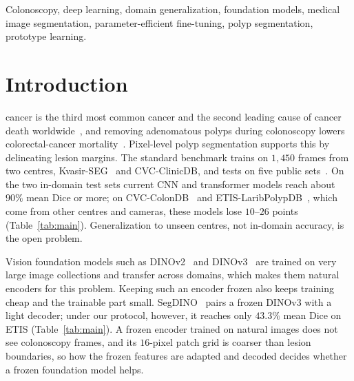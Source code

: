 \documentclass{ieeeaccess}
\begin{document}
\begin{keywords}
Colonoscopy, deep learning, domain generalization, foundation models, medical image segmentation, parameter-efficient fine-tuning, polyp segmentation, prototype learning.
\end{keywords}

\titlepgskip=-21pt

\maketitle

\section{Introduction}
\label{sec:introduction}
 cancer is the third most common cancer and the second leading cause of cancer death worldwide~\cite{sung2021globocan}, and removing adenomatous polyps during colonoscopy lowers colorectal-cancer mortality~\cite{zauber2012polypectomy}. Pixel-level polyp segmentation supports this by delineating lesion margins. The standard benchmark trains on $1{,}450$ frames from two centres, Kvasir-SEG~\cite{jha2020kvasir} and CVC-ClinicDB, and tests on five public sets~\cite{fan2020pranet}. On the two in-domain test sets current CNN and transformer models reach about $90\%$ mean Dice or more; on CVC-ColonDB~\cite{tajbakhsh2015automated} and ETIS-LaribPolypDB~\cite{silva2014toward}, which come from other centres and cameras, these models lose $10$--$26$ points (Table~\ref{tab:main}). Generalization to unseen centres, not in-domain accuracy, is the open problem.

Vision foundation models such as DINOv2~\cite{oquab2024dinov2} and DINOv3~\cite{simeoni2025dinov3} are trained on very large image collections and transfer across domains, which makes them natural encoders for this problem. Keeping such an encoder frozen also keeps training cheap and the trainable part small. SegDINO~\cite{yang2025segdino} pairs a frozen DINOv3 with a light decoder; under our protocol, however, it reaches only $43.3\%$ mean Dice on ETIS (Table~\ref{tab:main}). A frozen encoder trained on natural images does not see colonoscopy frames, and its $16$-pixel patch grid is coarser than lesion boundaries, so how the frozen features are adapted and decoded decides whether a frozen foundation model helps.
\end{document}
